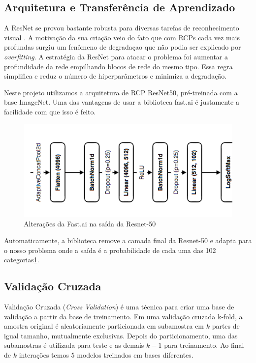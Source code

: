 \documentclass[conference]{IEEEtran}
\begin{document}
\subsection{Arquitetura e Transferência de Aprendizado}

A ResNet se provou bastante robusta para diversas tarefas de reconhecimento visual \cite{resnext}.  A motivação da sua criação veio do fato que com RCPs cada vez mais profundas surgiu um fenômeno de degradaçao que não podia ser explicado por \textit{overfitting}. A estratégia da ResNet para atacar o problema foi aumentar a profundidade da rede empilhando blocos de rede do mesmo tipo. Essa regra simplifica e reduz o número de hiperparâmetros e minimiza a degradação.

Neste projeto utilizamos a arquitetura de RCP ResNet50, pré-treinada com a base ImageNet. Uma das vantagens de usar a biblioteca fast.ai\cite{fastai} é justamente a facilidade com que isso é feito. 
\begin{figure}[ht!]
\begin{center}
\includegraphics[width=.75\columnwidth]{resnet-50-2.png}
\caption{Alterações da Fast.ai na saída da Resnet-50}
\label{resnet50}
\end{center}
\end{figure}

Automaticamente, a biblioteca remove a camada final da Resnet-50 e adapta para o nosso problema onde a saída é a probabilidade de cada uma das 102 categorias\ref{resnet50}.


 
\subsection{Validação Cruzada}
Validação Cruzada (\textit{Cross Validation}) é uma técnica para criar uma base de validação a partir da base de treinamento. Em uma validação cruzada k-fold, a amostra original é aleatoriamente particionada em subamostra em \(k\) partes de igual tamanho, mutualmente exclusivas.  Depois do particionamento, uma das subamostras é utilizada para teste e as demais \(k-1\) para treinamento. Ao final de \(k\) interações temos 5 modelos treinados em bases diferentes.
\end{document}
